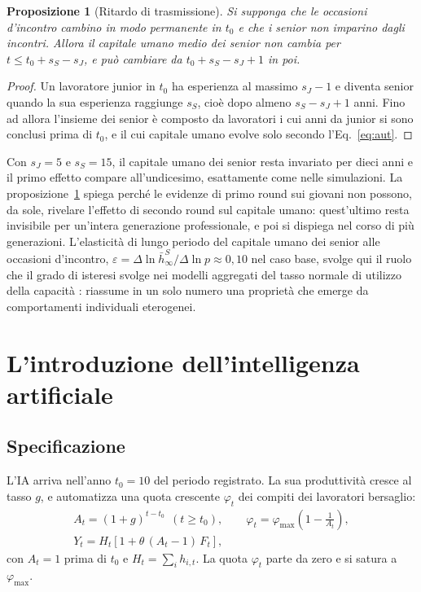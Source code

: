 \documentclass[preprint,12pt,authoryear]{elsarticle}
\newtheorem{proposition}{Proposizione}
\begin{document}
\begin{proposition}[Ritardo di trasmissione]\label{prop:lag}
Si supponga che le occasioni d'incontro cambino in modo permanente in $t_0$ e che i senior non imparino dagli incontri. Allora il capitale umano medio dei senior non cambia per $t \le t_0 + s_S - s_J$, e può cambiare da $t_0 + s_S - s_J + 1$ in poi.
\end{proposition}
\begin{proof}
Un lavoratore junior in $t_0$ ha esperienza al massimo $s_J-1$ e diventa senior quando la sua esperienza raggiunge $s_S$, cioè dopo almeno $s_S-s_J+1$ anni. Fino ad allora l'insieme dei senior è composto da lavoratori i cui anni da junior si sono conclusi prima di $t_0$, e il cui capitale umano evolve solo secondo l'Eq.~\eqref{eq:aut}.
\end{proof}

Con $s_J=5$ e $s_S=15$, il capitale umano dei senior resta invariato per dieci anni e il primo effetto compare all'undicesimo, esattamente come nelle simulazioni. La proposizione~\ref{prop:lag} spiega perché le evidenze di primo round sui giovani \citep{Brynjolfsson2025} non possono, da sole, rivelare l'effetto di secondo round sul capitale umano: quest'ultimo resta invisibile per un'intera generazione professionale, e poi si dispiega nel corso di più generazioni. L'elasticità di lungo periodo del capitale umano dei senior alle occasioni d'incontro, $\varepsilon = \Delta \ln \bar h^S_\infty / \Delta\ln p \approx 0{,}10$ nel caso base, svolge qui il ruolo che il grado di isteresi svolge nei modelli aggregati del tasso normale di utilizzo della capacità \citep{Bassi2022}: riassume in un solo numero una proprietà che emerge da comportamenti individuali eterogenei.

\section{L'introduzione dell'intelligenza artificiale}\label{sec:ai}

\subsection{Specificazione}

L'IA arriva nell'anno $t_0=10$ del periodo registrato. La sua produttività cresce al tasso $g$, e automatizza una quota crescente $\varphi_t$ dei compiti dei lavoratori bersaglio:
\begin{gather}
A_t = (1+g)^{t-t_0}\ \ (t\ge t_0), \qquad \varphi_t = \varphi_{\max}\left(1-\frac{1}{A_t}\right), \label{eq:ai}\\
Y_t = H_t\left[1+\theta\,(A_t-1)\,F_t\right], \label{eq:aiY}
\end{gather}
con $A_t=1$ prima di $t_0$ e $H_t=\sum_i h_{i,t}$. La quota $\varphi_t$ parte da zero e si satura a $\varphi_{\max}$.
\end{document}
